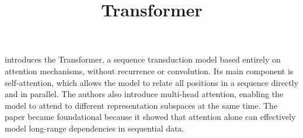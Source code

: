 \documentclass[a4paper]{article}
\title{Transformer}
\date{}
\begin{document}
    \maketitle
    \cite{vaswani-2017-attention-is-all-you-need} introduces the Transformer, a sequence transduction model based entirely on attention mechanisms, without recurrence or convolution. Its main component is self-attention, which allows the model to relate all positions in a sequence directly and in parallel. The authors also introduce multi-head attention, enabling the model to attend to different representation subspaces at the same time. The paper became foundational because it showed that attention alone can effectively model long-range dependencies in sequential data.
    
    
\end{document}
